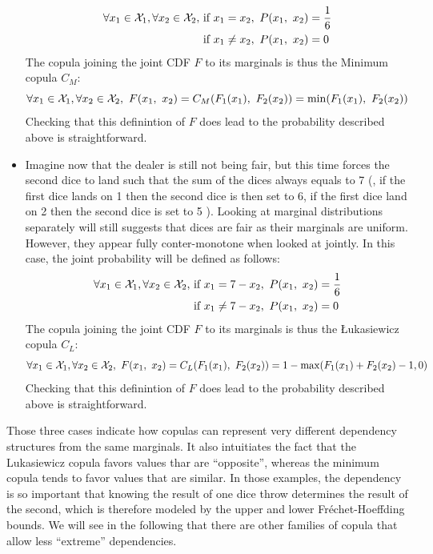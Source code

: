 \begin{example}
\begin{itemize}
		\begin{align*}
			\forall x_1\in{\mathcal{X}}_1, \forall x_2 \in {\mathcal{X}}_2, &\text{ if }x_1=x_2, ~P(x_1,~x_2)=\frac{1}{6}\\
			&\text{ if }x_1\neq x_2, ~P(x_1,~x_2)=0\\
		\end{align*}
		The copula joining the joint CDF \( F \) to its marginals is thus the Minimum copula $C_M$:
		\begin{equation*}
			\forall x_1\in{\mathcal{X}}_1, \forall x_2 \in {\mathcal{X}}_2, ~F(x_1,~x_2)=C_M(F_1(x_1),~F_2(x_2))=\min(F_1(x_1),~F_2(x_2))
		\end{equation*}
		Checking that this definintion of \( F \) does lead to the probability described above is straightforward. 
		\item Imagine now that the dealer is still not being fair, but this time forces the second dice to land such that the sum of the dices always equals to 7 (\ie, if the first dice lands on 1 then the second dice is then set to 6, if the first dice land on 2 then the second dice is set to 5 \etc). Looking at marginal distributions separately will still suggests that dices are fair as their marginals are uniform. However, they appear fully conter-monotone when looked at jointly. In this case, the joint probability will be defined as follows: 
		\begin{align*}
			\forall x_1\in{\mathcal{X}}_1, \forall x_2 \in {\mathcal{X}}_2, &\text{ if }x_1=7-x_2, ~P(x_1,~x_2)=\frac{1}{6}\\
			&\text{ if }x_1\neq 7-x_2, ~P(x_1,~x_2)=0\\
		\end{align*}
		The copula joining the joint CDF \( F \) to its marginals is thus the \L ukasiewicz copula $C_L$:
		\begin{equation*}
			\forall x_1\in{\mathcal{X}}_1, \forall x_2 \in {\mathcal{X}}_2, ~F(x_1,~x_2)=C_L(F_1(x_1),~F_2(x_2))=1-\max(F_1(x_1)+F_2(x_2) - 1, 0)
		\end{equation*}
		Checking that this definintion of \( F \) does lead to the probability described above is straightforward. 
	\end{itemize}
	Those three cases indicate how copulas can represent very different dependency structures from the same marginals. It also intuitiates the fact that the Lukasiewicz copula favors values thar are ``opposite'', whereas the minimum copula tends to favor values that are similar. In those examples, the dependency is so important that knowing the result of one dice throw determines the result of the second, which is therefore modeled by the upper and lower Fréchet-Hoeffding bounds.  We will see in the following that there are other families of copula that allow less ``extreme'' dependencies.
\end{example}

